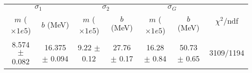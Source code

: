 \begin{tabular}{cc|cc|cc||c}
\multicolumn{2}{c|}{$\sigma_1$} & \multicolumn{2}{|c}{$\sigma_2$} & \multicolumn{2}{|c}{$\sigma_G$}  & \multirow{2}{*}{$\chi^2/$ndf}\\
$m$ ($\times1e5$) & $b$ (MeV) & $m$ ($\times1e5$) & $b$ (MeV) & $m$ ($\times1e5$) & $b$ (MeV) & \\
\hline
8.574 $\pm$ 0.082 & 16.375 $\pm$ 0.094 & 9.22 $\pm$ 0.12 & 27.76 $\pm$ 0.17 & 16.28 $\pm$ 0.84 & 50.73 $\pm$ 0.65 & 3109/1194\\
\end{tabular}
